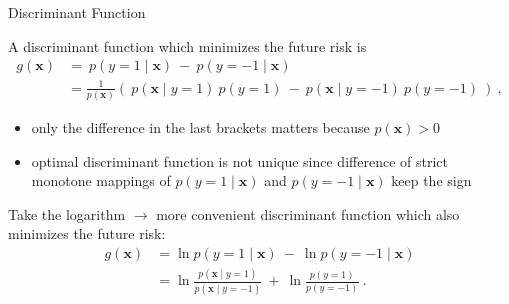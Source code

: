 \documentclass[xcolor=pdftex,dvipsnames,table]{beamer}
\begin{document}
\begin{frame}{Discriminant Function}
	\par
	\scriptsize
	\textcolor{NavyBlue}{A discriminant function which minimizes the future risk is}
	\begin{equation*}
		\begin{split}
			g(\mathbf{x}) & = \ p(y=1 \mid \mathbf{x} ) \ - \  p(y=-1 \mid \mathbf{x} ) \\
			              & = \frac{1}{p(\mathbf{x})} \left( \ p(\mathbf{x} \mid y=1) \  p(y=1) \ - \ p(\mathbf{x} \mid y=-1) \  p(y=-1) \ \right) \ ,
		\end{split}
	\end{equation*}
	
	\begin{itemize}
		\item only the difference in the last brackets matters because $p(\mathbf{x}) >0$
		\item optimal discriminant function is not unique since difference of strict monotone mappings of $ p(y=1
		\mid \mathbf{x} )$ and $p(y=-1 \mid \mathbf{x} )$ keep the sign 
	\end{itemize}

	Take the logarithm $\rightarrow$ more convenient discriminant function which also
	minimizes the future risk:
	\begin{equation*}
		\begin{split}
			g(\mathbf{x}) & = \ln p(y=1 \mid \mathbf{x} ) \ - \  \ln p(y=-1 \mid \mathbf{x} ) \\
				          & = \ln \frac{ p(\mathbf{x} \mid y=1)}{p(\mathbf{x} \mid y=-1)} \ + \ \ln \frac{ p(y=1)}{ p(y=-1)} \ .
		\end{split}
	\end{equation*}
\end{frame}
\end{document}
